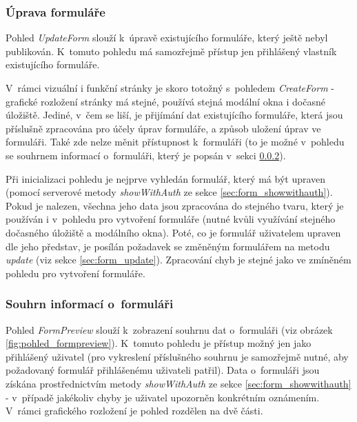 		\subsubsection{Úprava formuláře}\label{sec:pohled_uprava_formulare} %
		Pohled \textit{UpdateForm} slouží k~úpravě existujícího formuláře, který ještě nebyl publikován. K~tomuto pohledu má samozřejmě přístup jen přihlášený vlastník existujícího formuláře.
		
		V~rámci vizuální i funkční stránky je skoro totožný s~pohledem \textit{CreateForm} - grafické rozložení stránky má stejné, používá stejná modální okna i dočasné úložiště. Jediné, v~čem se liší, je přijímání dat existujícího formuláře, která jsou příslušně zpracována pro účely úprav formuláře, a způsob uložení úprav ve formuláři. Také zde nelze měnit přístupnost k~formuláři (to je možné v~pohledu se souhrnem informací o~formuláři, který je popsán v~sekci \ref{sec:pohled_souhrn_formulare}).
		
		Při inicializaci pohledu je nejprve vyhledán formulář, který má být upraven (pomocí serverové metody \textit{showWithAuth} ze sekce \ref{sec:form_showwithauth}). Pokud je nalezen, všechna jeho data jsou zpracována do stejného tvaru, který je používán i v~pohledu pro vytvoření formuláře (nutné kvůli využívání stejného dočasného úložiště a modálního okna). Poté, co je formulář uživatelem upraven dle jeho představ, je posílán požadavek se změněným formulářem na metodu \textit{update} (viz sekce \ref{sec:form_update}). Zpracování chyb je stejné jako ve zmíněném pohledu pro vytvoření formuláře.
		
		\subsubsection{Souhrn informací o~formuláři}\label{sec:pohled_souhrn_formulare} %
		Pohled \textit{FormPreview} slouží k~zobrazení souhrnu dat o~formuláři (viz obrázek \ref{fig:pohled_formpreview}). K~tomuto pohledu je přístup možný jen jako přihlášený uživatel (pro vykreslení příslušného souhrnu je samozřejmě nutné, aby požadovaný formulář přihlášenému uživateli patřil). Data o~formuláři jsou získána prostřednictvím metody \textit{showWithAuth} ze sekce  \ref{sec:form_showwithauth} - v~případě jakékoliv chyby je uživatel upozorněn konkrétním oznámením. V~rámci grafického rozložení je pohled rozdělen na dvě části. 
		
